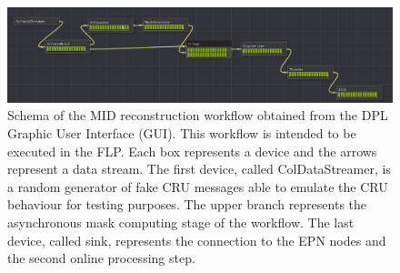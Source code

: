 \begin{figure}[!ht]
\begin{center}
\includegraphics[width=1\linewidth]{Chapters/O2/Figs/MID_workflow.pdf}
\caption{Schema of the MID reconstruction workflow obtained from the DPL Graphic User Interface (GUI). This workflow is intended to be executed in the FLP. Each box represents a device and the arrows represent a data stream. The first device, called ColDataStreamer, is a random generator of fake CRU messages able to emulate the CRU behaviour for testing purposes. The upper branch represents the asynchronous mask computing stage of the workflow. The last device, called sink, represents the connection to the EPN nodes and the second online processing step.}
\label{fig:MID_workflow}
\end{center}
\end{figure}

